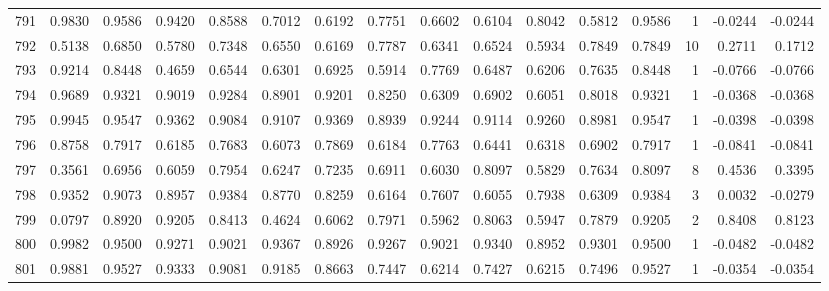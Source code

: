 \begin{tabular}{lrrrrrrrrrrrrrrr}
791 &      0.9830 &  0.9586 &  0.9420 &  0.8588 &  0.7012 &  0.6192 &  0.7751 &  0.6602 &  0.6104 &  0.8042 &   0.5812 &     0.9586 &      1 &                   -0.0244 &                    -0.0244 \\
792 &      0.5138 &  0.6850 &  0.5780 &  0.7348 &  0.6550 &  0.6169 &  0.7787 &  0.6341 &  0.6524 &  0.5934 &   0.7849 &     0.7849 &     10 &                    0.2711 &                     0.1712 \\
793 &      0.9214 &  0.8448 &  0.4659 &  0.6544 &  0.6301 &  0.6925 &  0.5914 &  0.7769 &  0.6487 &  0.6206 &   0.7635 &     0.8448 &      1 &                   -0.0766 &                    -0.0766 \\
794 &      0.9689 &  0.9321 &  0.9019 &  0.9284 &  0.8901 &  0.9201 &  0.8250 &  0.6309 &  0.6902 &  0.6051 &   0.8018 &     0.9321 &      1 &                   -0.0368 &                    -0.0368 \\
795 &      0.9945 &  0.9547 &  0.9362 &  0.9084 &  0.9107 &  0.9369 &  0.8939 &  0.9244 &  0.9114 &  0.9260 &   0.8981 &     0.9547 &      1 &                   -0.0398 &                    -0.0398 \\
796 &      0.8758 &  0.7917 &  0.6185 &  0.7683 &  0.6073 &  0.7869 &  0.6184 &  0.7763 &  0.6441 &  0.6318 &   0.6902 &     0.7917 &      1 &                   -0.0841 &                    -0.0841 \\
797 &      0.3561 &  0.6956 &  0.6059 &  0.7954 &  0.6247 &  0.7235 &  0.6911 &  0.6030 &  0.8097 &  0.5829 &   0.7634 &     0.8097 &      8 &                    0.4536 &                     0.3395 \\
798 &      0.9352 &  0.9073 &  0.8957 &  0.9384 &  0.8770 &  0.8259 &  0.6164 &  0.7607 &  0.6055 &  0.7938 &   0.6309 &     0.9384 &      3 &                    0.0032 &                    -0.0279 \\
799 &      0.0797 &  0.8920 &  0.9205 &  0.8413 &  0.4624 &  0.6062 &  0.7971 &  0.5962 &  0.8063 &  0.5947 &   0.7879 &     0.9205 &      2 &                    0.8408 &                     0.8123 \\
800 &      0.9982 &  0.9500 &  0.9271 &  0.9021 &  0.9367 &  0.8926 &  0.9267 &  0.9021 &  0.9340 &  0.8952 &   0.9301 &     0.9500 &      1 &                   -0.0482 &                    -0.0482 \\
801 &      0.9881 &  0.9527 &  0.9333 &  0.9081 &  0.9185 &  0.8663 &  0.7447 &  0.6214 &  0.7427 &  0.6215 &   0.7496 &     0.9527 &      1 &                   -0.0354 &                    -0.0354 \\

\end{tabular}
